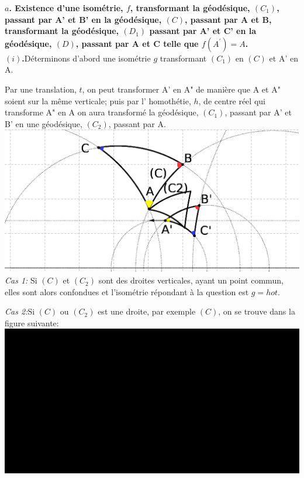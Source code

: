 \documentclass[a4paper, 12pt, twoside]{book}
\begin{document}
 
 \textbf{$a$. Existence d'une isométrie, $f$,  transformant la géodésique, $(C_{1})$, passant par A' et B' en   la géodésique, $(C)$, passant par A et B, transformant la géodésique, $(D_{1})$  passant par A' et C' en   la géodésique,  $(D)$, passant par A et C telle que $f(A^{'})=A$. }\\
 
 \textbf{$(i)$.}Déterminons d'abord une isométrie $g$ transformant  $(C_{1})$  en  $(C)$ et A' en A.\
 
   Par une translation, $t$, on peut transformer A' en A" de manière que A et A" soient sur la même verticale; puis par l' homothétie, $h$, de centre réel qui transforme A" en A on aura transformé la géodésique, $(C_{1})$, passant par A' et B' en une géodésique, $(C_{2})$, passant par A.\\
   
    \includegraphics[scale=0.7]{figures/hyper112.eps} \\
 
 \textit{Cas 1:} Si  $(C)$ et $(C_{2})$ sont des droites verticales, ayant un point commun,  elles sont alors confondues et  l'isométrie répondant à la question est $g=hot$.\
 
  \textit{Cas 2:}Si  $(C)$ ou $(C_{2})$ est une droite, par exemple $(C)$, on se trouve dans la figure suivante:\\
  
  
  
  \includegraphics[scale=0.5]{figures/hyper16.eps} \\
  
\end{document}
